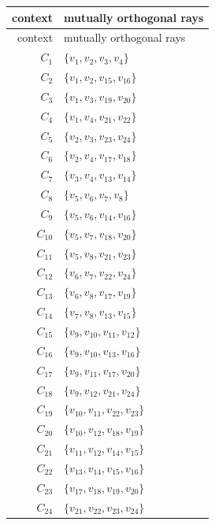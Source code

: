 \begin{longtable}{@{}r l@{}}
\toprule
context & mutually orthogonal rays\\
\midrule
\endfirsthead
\toprule
context & mutually orthogonal rays\\
\midrule
\endhead
$C_{1}$ & $\{v_{1},v_{2},v_{3},v_{4}\}$\\
$C_{2}$ & $\{v_{1},v_{2},v_{15},v_{16}\}$\\
$C_{3}$ & $\{v_{1},v_{3},v_{19},v_{20}\}$\\
$C_{4}$ & $\{v_{1},v_{4},v_{21},v_{22}\}$\\
$C_{5}$ & $\{v_{2},v_{3},v_{23},v_{24}\}$\\
$C_{6}$ & $\{v_{2},v_{4},v_{17},v_{18}\}$\\
$C_{7}$ & $\{v_{3},v_{4},v_{13},v_{14}\}$\\
$C_{8}$ & $\{v_{5},v_{6},v_{7},v_{8}\}$\\
$C_{9}$ & $\{v_{5},v_{6},v_{14},v_{16}\}$\\
$C_{10}$ & $\{v_{5},v_{7},v_{18},v_{20}\}$\\
$C_{11}$ & $\{v_{5},v_{8},v_{21},v_{23}\}$\\
$C_{12}$ & $\{v_{6},v_{7},v_{22},v_{24}\}$\\
$C_{13}$ & $\{v_{6},v_{8},v_{17},v_{19}\}$\\
$C_{14}$ & $\{v_{7},v_{8},v_{13},v_{15}\}$\\
$C_{15}$ & $\{v_{9},v_{10},v_{11},v_{12}\}$\\
$C_{16}$ & $\{v_{9},v_{10},v_{13},v_{16}\}$\\
$C_{17}$ & $\{v_{9},v_{11},v_{17},v_{20}\}$\\
$C_{18}$ & $\{v_{9},v_{12},v_{21},v_{24}\}$\\
$C_{19}$ & $\{v_{10},v_{11},v_{22},v_{23}\}$\\
$C_{20}$ & $\{v_{10},v_{12},v_{18},v_{19}\}$\\
$C_{21}$ & $\{v_{11},v_{12},v_{14},v_{15}\}$\\
$C_{22}$ & $\{v_{13},v_{14},v_{15},v_{16}\}$\\
$C_{23}$ & $\{v_{17},v_{18},v_{19},v_{20}\}$\\
$C_{24}$ & $\{v_{21},v_{22},v_{23},v_{24}\}$\\
\bottomrule
\end{longtable}
